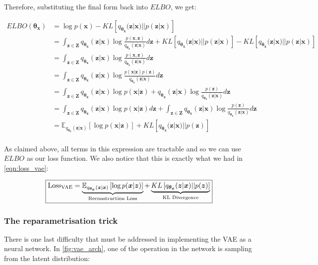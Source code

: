                 Therefore, substituting the final form back into $ELBO$, we get:
                
                \begin{align*}
                    ELBO(\bm{\theta_x}) &= \log p(\bm{x}) - KL\left[q_{\bm{\theta_x}}(\bm{z}|\bm{x}) || p(\bm{z}|\bm{x})\right]\\
                    &= \int_{\bm{z} \in \bm{Z}} q_{\bm{\theta_x}}(\bm{z}|\bm{x}) \log \frac{p(\bm{x}, \bm{z})}{q_{\bm{\theta_x}}(\bm{z}|\bm{x})} d\bm{z} + KL\left[q_{\bm{\theta_x}}(\bm{z}|\bm{x}) || p(\bm{z}|\bm{x})\right] - KL\left[q_{\bm{\theta_x}}(\bm{z}|\bm{x}) || p(\bm{z}|\bm{x})\right]\\
                    &= \int_{\bm{z} \in \bm{Z}} q_{\bm{\theta_x}}(\bm{z}|\bm{x}) \log \frac{p(\bm{x}, \bm{z})}{q_{\bm{\theta_x}}(\bm{z}|\bm{x})} d\bm{z}\\
                    &= \int_{\bm{z} \in \bm{Z}} q_{\bm{\theta_x}}(\bm{z}|\bm{x}) \log \frac{p(\bm{x} | \bm{z})p(\bm{z})}{q_{\bm{\theta_x}}(\bm{z}|\bm{x})} d\bm{z}\\
                    &= \int_{\bm{z} \in \bm{Z}} q_{\bm{\theta_x}}(\bm{z}|\bm{x}) \log p(\bm{x} | \bm{z}) + q_{\bm{\theta_x}}(\bm{z}|\bm{x}) \log \frac{p(\bm{z})}{q_{\bm{\theta_x}}(\bm{z}|\bm{x})} d\bm{z}\\
                    &= \int_{\bm{z} \in \bm{Z}} q_{\bm{\theta_x}}(\bm{z}|\bm{x}) \log p(\bm{x} | \bm{z}) d\bm{z} + \int_{\bm{z} \in \bm{Z}} q_{\bm{\theta_x}}(\bm{z}|\bm{x}) \log \frac{p(\bm{z})}{q_{\bm{\theta_x}}(\bm{z}|\bm{x})} d\bm{z}\\
                    &= \mathbb{E}_{q_{\bm{\theta_x}}(\bm{z}|\bm{x})} \left[\log p(\bm{x} | \bm{z}) \right] + KL\left[q_{\bm{\theta_x}}(\bm{z}|\bm{x}) || p(\bm{z})\right]\\
                \end{align*}
                
                As claimed above, all terms in this expression are tractable and so we can use $ELBO$ as our loss function. We also notice that this is exactly what we had in \ref{eqn:loss_vae}:
                
                \[ \boxed{\text{Loss\textsubscript{VAE}} = \underbrace{\mathbb{E}_{q_{\bm{\theta_x}}(\bm{z}|\bm{x})} \left[\log p(\bm{x} | \bm{z}) \right]}_\textrm{Reconstruction Loss} + \underbrace{KL\left[q_{\bm{\theta_x}}(\bm{z}|\bm{x}) || p(\bm{z})\right]}_\textrm{KL Divergence}} \]
                
            \subsubsection{The reparametrisation trick}
                There is one last difficulty that must be addressed in implementing the VAE as a neural network. In \ref{fig:vae_arch}, one of the operation in the network is sampling from the latent distribution:
                
